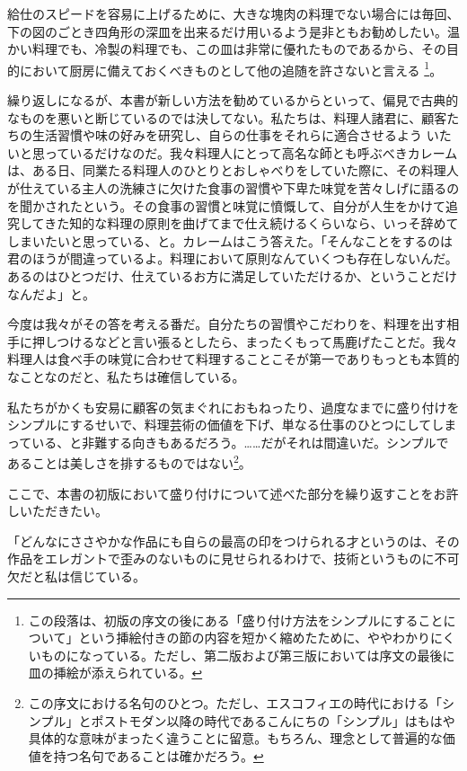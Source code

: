給仕のスピードを容易に上げるために、大きな塊肉の料理でない場合には毎回、下の図のごとき四角形の深皿を出来るだけ用いるよう是非ともお勧めしたい。温かい料理でも、冷製の料理でも、この皿は非常に優れたものであるから、その目的において厨房に備えておくべきものとして他の追随を許さないと言える
\footnote{この段落は、初版の序文の後にある「盛り付け方法をシンプルにすることについて」という挿絵付きの節の内容を短かく縮めたために、ややわかりにくいものになっている。ただし、第二版および第三版においては序文の最後に皿の挿絵が添えられている。}。

繰り返しになるが、本書が新しい方法を勧めているからといって、偏見で古典的なものを悪いと断じているのでは決してない。私たちは、料理人諸君に、顧客たちの生活習慣や味の好みを研究し、自らの仕事をそれらに適合させるよう
いたいと思っているだけなのだ。我々料理人にとって高名な師とも呼ぶべきカレームは、ある日、同業たる料理人のひとりとおしゃべりをしていた際に、その料理人が仕えている主人の洗練さに欠けた食事の習慣や下卑た味覚を苦々しげに語るのを聞かされたという。その食事の習慣と味覚に憤慨して、自分が人生をかけて追究してきた知的な料理の原則を曲げてまで仕え続けるくらいなら、いっそ辞めてしまいたいと思っている、と。カレームはこう答えた。「そんなことをするのは君のほうが間違っているよ。料理において原則なんていくつも存在しないんだ。あるのはひとつだけ、仕えているお方に満足していただけるか、ということだけなんだよ」と。

今度は我々がその答を考える番だ。自分たちの習慣やこだわりを、料理を出す相手に押しつけるなどと言い張るとしたら、まったくもって馬鹿げたことだ。我々料理人は食べ手の味覚に合わせて料理することこそが第一でありもっとも本質的なことなのだと、私たちは確信している。

私たちがかくも安易に顧客の気まぐれにおもねったり、過度なまでに盛り付けをシンプルにするせいで、料理芸術の価値を下げ、単なる仕事のひとつにしてしまっている、と非難する向きもあるだろう。\ldots{}\ldots{}だがそれは間違いだ。シンプルであることは美しさを排するものではない\footnote{この序文における名句のひとつ。ただし、エスコフィエの時代における「シンプル」とポストモダン以降の時代であるこんにちの「シンプル」はもはや具体的な意味がまったく違うことに留意。もちろん、理念として普遍的な価値を持つ名句であることは確かだろう。}。

ここで、本書の初版において盛り付けについて述べた部分を繰り返すことをお許しいただきたい。

「どんなにささやかな作品にも自らの最高の印をつけられる才というのは、その作品をエレガントで歪みのないものに見せられるわけで、技術というものに不可欠だと私は信じている。

